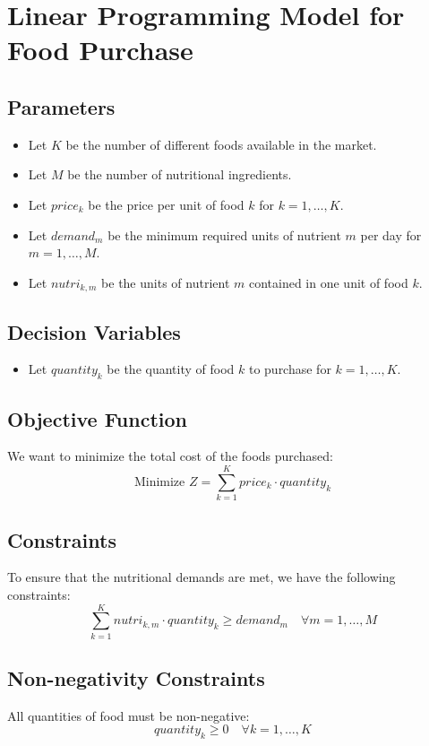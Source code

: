 \documentclass{article}
\begin{document}
\section*{Linear Programming Model for Food Purchase}

\subsection*{Parameters}
\begin{itemize}
    \item Let \( K \) be the number of different foods available in the market.
    \item Let \( M \) be the number of nutritional ingredients.
    \item Let \( price_k \) be the price per unit of food \( k \) for \( k = 1, \ldots, K \).
    \item Let \( demand_m \) be the minimum required units of nutrient \( m \) per day for \( m = 1, \ldots, M \).
    \item Let \( nutri_{k,m} \) be the units of nutrient \( m \) contained in one unit of food \( k \).
\end{itemize}

\subsection*{Decision Variables}
\begin{itemize}
    \item Let \( quantity_k \) be the quantity of food \( k \) to purchase for \( k = 1, \ldots, K \).
\end{itemize}

\subsection*{Objective Function}
We want to minimize the total cost of the foods purchased:
\[
\text{Minimize } Z = \sum_{k=1}^{K} price_k \cdot quantity_k
\]

\subsection*{Constraints}
To ensure that the nutritional demands are met, we have the following constraints:
\[
\sum_{k=1}^{K} nutri_{k,m} \cdot quantity_k \geq demand_m \quad \forall m = 1, \ldots, M
\]

\subsection*{Non-negativity Constraints}
All quantities of food must be non-negative:
\[
quantity_k \geq 0 \quad \forall k = 1, \ldots, K
\]
\end{document}
